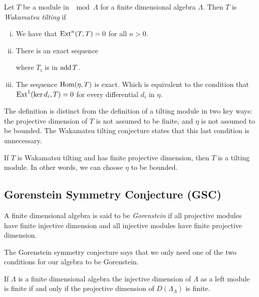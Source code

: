 \begin{defn}
	Let $T$ be a module in $\mod\Lambda$ for a finite dimensional algebra $\Lambda$. Then $T$ is \emph{Wakamatsu tilting} if
	\begin{enumerate}[i)]
		\item We have that $\operatorname{Ext}^n(T,T)=0$ for all $n >0$.
		\item There is an exact sequence 
		\begin{center}
		\end{center}
		where $T_i$ is in $\operatorname{add} T$.
		\item The sequence $\operatorname{Hom}(\eta, T)$ is exact. Which is equivalent to the condition that $\operatorname{Ext}^1(\operatorname{ker} d_i, T)=0$ for every differential $d_i$ in $\eta$.
	\end{enumerate}
\end{defn}

The definition is distinct from the definition of a tilting module in two key ways: the projective dimension of $T$ is not assumed to be finite, and $\eta$ is not assumed to be bounded. The Wakamatsu tilting conjecture states that this last condition is unnecessary.

\begin{conj} 
	If $T$ is Wakamatsu tilting and has finite projective dimension, then $T$ is a tilting module. In other words, we can choose $\eta$ to be bounded.
\end{conj}

\subsection*{Gorenstein Symmetry Conjecture (GSC)}

\begin{defn}
	A finite dimensional algebra is said to be \emph{Gorenstein} if all projective modules have finite injective dimension and all injective modules have finite projective dimension.
\end{defn}

The Gorenstein symmetry conjecture says that we only need one of the two conditions for our algebra to be Gorenstein.

\begin{conj} 
	If $\Lambda$ is a finite dimensional algebra the injective dimension of $\Lambda$ as a left module is finite if and only if the projective dimension of $D(\Lambda_\Lambda)$ is finite.
\end{conj}

